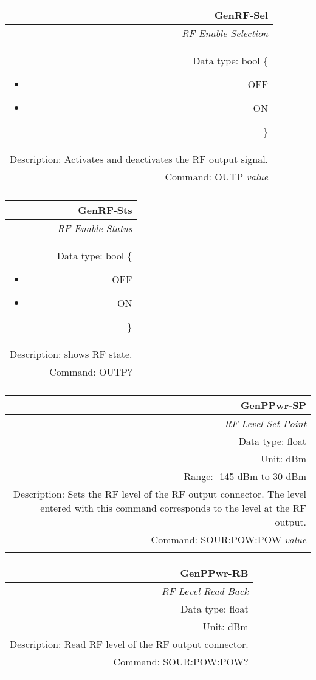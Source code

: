 \documentclass[openany]{article}
\begin{document}
		\begin{tabular}{N}
			\hline
			\bfseries GenRF-Sel \\ \hline
			\emph{RF Enable Selection} \\
			Data type: bool \{\begin{itemize}[noitemsep]
				\small
				\item[] OFF
				\item[] ON
			\end{itemize}\} \\
			Description: Activates and deactivates the RF output signal. \\
			Command: OUTP \emph{value} \\
			\\

		\end{tabular}


		\begin{tabular}{N}
			\hline
			\bfseries GenRF-Sts \\ \hline
			\emph{RF Enable Status} \\
			Data type: bool \{\begin{itemize}[noitemsep]
				\small
				\item[] OFF
				\item[] ON
			\end{itemize}\} \\
			Description: shows RF state. \\
			Command: OUTP? \\
			\\

		\end{tabular}


		\begin{tabular}{N}
			\hline
			\bfseries GenPPwr-SP \\ \hline
			\emph{RF Level Set Point} \\
			Data type: float \\
			Unit: dBm \\
			Range: -145 dBm to 30 dBm \\
			Description: Sets the RF level of the RF output connector. The level entered with this command corresponds to the level at the RF output. \\
			Command: SOUR:POW:POW \emph{value} \\
			\\

		\end{tabular}


		\begin{tabular}{N}
			\hline
			\bfseries GenPPwr-RB \\ \hline
			\emph{RF Level Read Back} \\
			Data type: float \\
			Unit: dBm \\
			Description: Read RF level of the RF output connector. \\
			Command: SOUR:POW:POW? \\
			\\

		\end{tabular}
\end{document}
